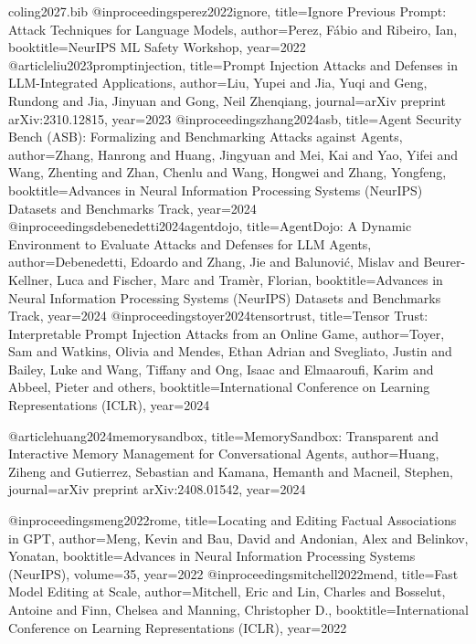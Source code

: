 \documentclass[11pt]{article}
\theoremstyle{remark}
\begin{document}
\begin{filecontents}{coling2027.bib}
@inproceedings{perez2022ignore,
  title={Ignore Previous Prompt: Attack Techniques for Language Models},
  author={Perez, F{\'a}bio and Ribeiro, Ian},
  booktitle={NeurIPS ML Safety Workshop}, year={2022}
}
@article{liu2023promptinjection,
  title={Prompt Injection Attacks and Defenses in {LLM}-Integrated Applications},
  author={Liu, Yupei and Jia, Yuqi and Geng, Rundong and Jia, Jinyuan and Gong, Neil Zhenqiang},
  journal={arXiv preprint arXiv:2310.12815}, year={2023}
}
@inproceedings{zhang2024asb,
  title={Agent Security Bench ({ASB}): Formalizing and Benchmarking Attacks against Agents},
  author={Zhang, Hanrong and Huang, Jingyuan and Mei, Kai and Yao, Yifei and Wang, Zhenting and
          Zhan, Chenlu and Wang, Hongwei and Zhang, Yongfeng},
  booktitle={Advances in Neural Information Processing Systems (NeurIPS) Datasets and Benchmarks Track},
  year={2024}
}
@inproceedings{debenedetti2024agentdojo,
  title={{AgentDojo}: A Dynamic Environment to Evaluate Attacks and Defenses for {LLM} Agents},
  author={Debenedetti, Edoardo and Zhang, Jie and Balunovi{\'c}, Mislav and Beurer-Kellner, Luca and
          Fischer, Marc and Tram{\`e}r, Florian},
  booktitle={Advances in Neural Information Processing Systems (NeurIPS) Datasets and Benchmarks Track},
  year={2024}
}
@inproceedings{toyer2024tensortrust,
  title={Tensor Trust: Interpretable Prompt Injection Attacks from an Online Game},
  author={Toyer, Sam and Watkins, Olivia and Mendes, Ethan Adrian and Svegliato, Justin and
          Bailey, Luke and Wang, Tiffany and Ong, Isaac and Elmaaroufi, Karim and Abbeel, Pieter and
          others},
  booktitle={International Conference on Learning Representations (ICLR)}, year={2024}
}

@article{huang2024memorysandbox,
  title={MemorySandbox: Transparent and Interactive Memory Management for Conversational Agents},
  author={Huang, Ziheng and Gutierrez, Sebastian and Kamana, Hemanth and Macneil, Stephen},
  journal={arXiv preprint arXiv:2408.01542}, year={2024}
}

@inproceedings{meng2022rome,
  title={Locating and Editing Factual Associations in {GPT}},
  author={Meng, Kevin and Bau, David and Andonian, Alex and Belinkov, Yonatan},
  booktitle={Advances in Neural Information Processing Systems (NeurIPS)}, volume={35}, year={2022}
}
@inproceedings{mitchell2022mend,
  title={Fast Model Editing at Scale},
  author={Mitchell, Eric and Lin, Charles and Bosselut, Antoine and Finn, Chelsea and Manning, Christopher D.},
  booktitle={International Conference on Learning Representations (ICLR)}, year={2022}
}


\end{filecontents}
\end{document}
